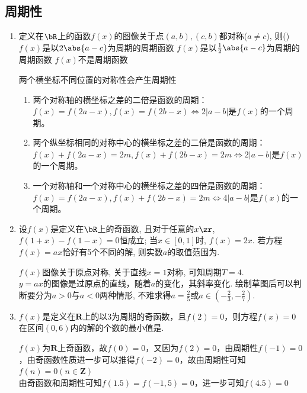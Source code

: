 \subsection*{周期性}
\begin{enumerate}
    \item 定义在$\bR$上的函数$f(x)$的图像关于点$(a,b),(c,b)$都对称($a\neq c$), 则\dotfill()
    {$f(x)$是以$2\abs{a-c}$为周期的周期函数}
    {$f(x)$是以$\frac{1}{2}\abs{a-c}$为周期的周期函数}
    {$f(x)$不是周期函数}
    \begin{jieda}
    两个横坐标不同位置的对称性会产生周期性
    \begin{enumerate}
        \item 两个对称轴的横坐标之差的二倍是函数的周期：$f(x) = f(2a-x), f(x) = f(2b - x) \Leftrightarrow 2|a-b|$是$f(x)$的一个周期。
        \item 两个纵坐标相同的对称中心的横坐标之差的二倍是函数的周期：$f(x) + f(2a-x) = 2m, f(x) + f(2b - x) = 2m \Leftrightarrow 2|a-b|$是$f(x)$的一个周期。
        \item 一个对称轴和一个对称中心的横坐标之差的四倍是函数的周期：$f(x) = f(2a-x), f(x) + f(2b - x) = 2m \Leftrightarrow 4|a-b|$是$f(x)$的一个周期。
    \end{enumerate}
    \end{jieda}
    \item 设$f(x)$是定义在$\bR$上的奇函数, 且对于任意的$x\zr$, $f(1+x)-f(1-x)=0$恒成立; 当$x\in[0,1]$时, $f(x)=2x$. 
    若方程$f(x)=ax$恰好有5个不同的解, 则实数$a$的取值范围为. 
    \begin{jieda}
    $f(x)$图像关于原点对称, 关于直线$x=1$对称, 可知周期$T=4$. \\
    $y = ax$的图像是过原点的直线，随着$a$的变化，其斜率变化. 绘制草图后可以判断要分为$a>0$与$a<0$两种情形, 
    不难求得$a=\frac{2}{5}$或$a\in(-\frac{2}{3},-\frac{2}{7})$. 
    \end{jieda}
    \item $f(x)$是定义在$\mathbf{R}$上的以3为周期的奇函数，且$f(2) = 0$，则方程$f(x) = 0$在区间$(0, 6)$内的解的个数的最小值是. 
    \begin{jieda}
        $f(x)$为$\mathbf{R}$上奇函数，故$f(0) = 0$，又因为$f(2) = 0$，由周期性$f(-1) = 0$，由奇函数性质进一步可以推得$f(-2) = 0$，故由周期性可知$f(n) = 0 (n \in \mathbf{Z})$ \\
        由奇函数和周期性可知$f(1.5) = f(-1,5) = 0$，进一步可知$f(4.5) = 0$ \\

\end{jieda}
\end{enumerate}
